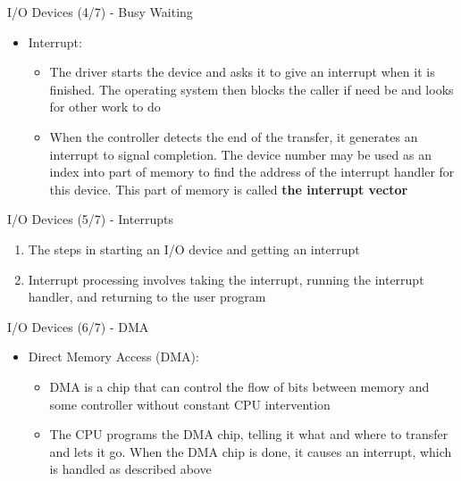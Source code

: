 \documentclass{beamer}
\begin{document}
\begin{frame}
{\centerline{I/O Devices (4/7) - Busy Waiting}}
\begin{itemize}
    \item Interrupt:
    \begin{itemize}
        \item The driver starts the device and asks it to give an interrupt when it is finished. The operating system then blocks the caller if need be and looks for other work to do
        \item When the controller detects the end of the transfer, it generates an interrupt to signal completion. The device number may be used as an index into part of memory to find the address of the interrupt handler for this device. This part of memory is called \textbf{the interrupt vector}
    \end{itemize}
\end{itemize}
\end{frame}


\begin{frame}
{\centerline{I/O Devices (5/7) - Interrupts}}
\begin{enumerate}
    \item The steps in starting an I/O device and getting an interrupt
    \item Interrupt processing involves taking the interrupt, running the interrupt handler, and returning to the user program
\end{enumerate}
\begin{figure}
    \centering
    
\end{figure}
\end{frame}

\begin{frame}
{\centerline{I/O Devices (6/7) - DMA}}
\begin{itemize}
    \item Direct Memory Access (DMA):
    \begin{itemize}
        \item DMA is a chip that can control the flow of bits between memory and some controller without constant CPU intervention
        \item The CPU programs the DMA chip, telling it what and where to transfer and lets it go. When the DMA chip is done, it causes an interrupt, which is handled as described above
    \end{itemize}
\end{itemize}
\end{frame}
\end{document}
